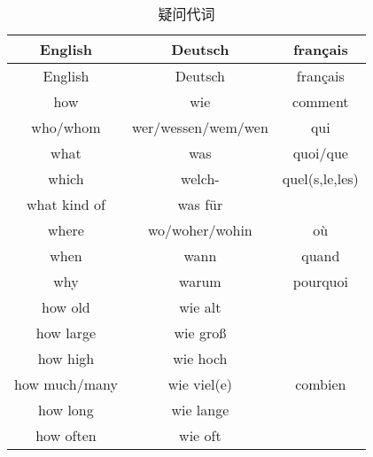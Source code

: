 \documentclass[12pt,A4paper,oneside,reqno]{amsart}
\numberwithin{equation}{section}
\theoremstyle{plain}
\theoremstyle{plain}
\theoremstyle{plain}
\numberwithin{equation}{section}
\theoremstyle{remark}
\begin{document}
\begin{longtable}{c|c|c}
	\hline
English	&	Deutsch	&	français	\\
	\hline
	\endhead
	\hline
English	&	Deutsch	&	français	\\	
	\hline
	\endfirsthead	
	\hline
	\endfoot
	\hline		
	\caption{疑问代词}
	\endlastfoot								
how	&	wie	&	comment	\\
who/whom	&	wer/wessen/wem/wen	&	qui	\\
what	&	was	&	quoi/que	\\
which	&	welch-	&	quel(s,le,les)	\\
what kind of	&	was f\"{u}r	&		\\
where	&	wo/woher/wohin	&	o\`{u}	\\
when	&	wann	&	quand	\\
why	&	warum	&	pourquoi	\\
\hline					
how old	&	wie alt	&		\\
how large	&	wie gro\ss	&		\\
how high	&	wie hoch	&		\\
how much/many	&	wie viel(e)	&	combien	\\
how long	&	wie lange	&		\\
how often	&	wie oft	&		\\


		
		
		
		\hline
\end{longtable}
\end{document}
